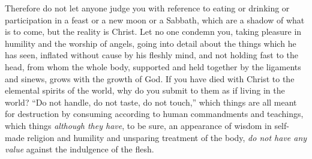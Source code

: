 \begin{biblechapter}
 Therefore do not let anyone judge you with reference to eating or drinking or participation in a feast or a new moon or a Sabbath,
\verse which are a shadow of what is to come, but the reality is Christ.
\verse Let no one condemn you, taking pleasure in humility and the worship of angels, going into detail about the things which he has seen, inflated without cause by his fleshly mind,
\verse and not holding fast to the head, from whom the whole body, supported and held together by the ligaments and sinews, grows with the growth of God.
\verse If you have died with Christ to the elemental spirits of the world, why do you submit to them as if living in the world?
\verse “Do not handle, do not taste, do not touch,”
\verse which things are all meant for destruction by consuming according to human commandments and teachings,
\verse which things \textit{although they have}, to be sure, an appearance of wisdom in self-made religion and humility and unsparing treatment of the body, \textit{do not have any value} against the indulgence of the flesh.
\end{biblechapter}

